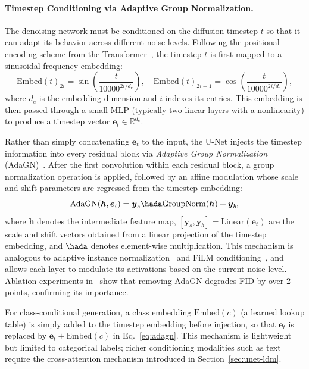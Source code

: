 \documentclass[../../book-main.tex]{subfiles}
\begin{document}
\paragraph{Timestep Conditioning via Adaptive Group Normalization.}
The denoising network must be conditioned on the diffusion timestep
$t$ so that it can adapt its behavior across different noise levels.
Following the positional encoding scheme from the
Transformer~\citep{vaswani2017attention}, the timestep $t$ is first
mapped to a sinusoidal frequency embedding:
\begin{equation}
\mathrm{Embed}(t)_{2i} = \sin\!\left(\frac{t}{10000^{2i/d_e}}\right), \quad
\mathrm{Embed}(t)_{2i+1} = \cos\!\left(\frac{t}{10000^{2i/d_e}}\right),
\end{equation}
where $d_e$ is the embedding dimension and $i$ indexes its entries.
This embedding is then passed through a small MLP (typically two
linear layers with a nonlinearity) to produce a timestep vector
$\boldsymbol{e}_t \in \mathbb{R}^{d_e}$.

Rather than simply concatenating $\boldsymbol{e}_t$ to the input, the
U-Net injects the timestep information into every residual block via
\emph{Adaptive Group Normalization}
(AdaGN)~\citep{dhariwal2021diffusion}. After the first convolution
within each residual block, a group normalization operation is
applied, followed by an affine modulation whose scale and shift
parameters are regressed from the timestep embedding:
\begin{equation}
\mathrm{AdaGN}(\boldsymbol{h}, \boldsymbol{e}_t) = \boldsymbol{y}_s
\hada \mathrm{GroupNorm}(\boldsymbol{h}) + \boldsymbol{y}_b,
\label{eq:adagn}
\end{equation}
where $\boldsymbol{h}$ denotes the intermediate feature map,
$[\boldsymbol{y}_s, \boldsymbol{y}_b] =
\mathrm{Linear}(\boldsymbol{e}_t)$ are the scale and shift vectors
obtained from a linear projection of the timestep embedding, and
$\hada$ denotes element-wise multiplication. This mechanism is
analogous to adaptive instance
normalization~\citep{dumoulin2017learned} and FiLM
conditioning~\citep{perez2018film}, and allows each layer to modulate
its activations based on the current noise level. Ablation
experiments in~\citep{dhariwal2021diffusion} show that removing AdaGN
degrades FID by over 2 points, confirming its importance.

For class-conditional generation, a class embedding
$\mathrm{Embed}(c)$ (a learned lookup table) is simply added to the
timestep embedding before injection, so that $\boldsymbol{e}_t$ is
replaced by $\boldsymbol{e}_t + \mathrm{Embed}(c)$ in
Eq.~\eqref{eq:adagn}. This mechanism is lightweight but limited to
categorical labels; richer conditioning modalities such as text
require the cross-attention mechanism introduced in Section~\ref{sec:unet-ldm}.
\end{document}
